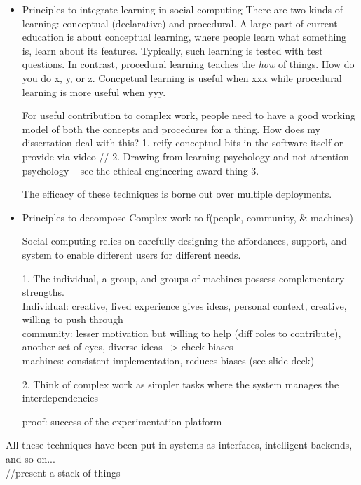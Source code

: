 \begin{itemize}
\item Principles to integrate learning in social computing 
There are two kinds of learning: conceptual (declarative) and procedural. A large part of current education is about conceptual learning, where people learn what something is, learn about its features. Typically, such learning is tested with test questions. In contrast, procedural learning teaches the {\it how} of things. How do you do x, y, or z.  Concpetual learning is useful when xxx while procedural learning is more useful when yyy.


For useful contribution to complex work, people need to have a good working model of both the concepts and procedures for a thing. How does my dissertation deal with this?
1. reify conceptual bits in the software itself or provide via video //
2. Drawing from learning psychology and not attention psychology 
-- see the ethical engineering award thing
3. 

The efficacy of these techniques is borne out over multiple deployments. 

\item  Principles to decompose Complex work to f(people, community, \& machines)

Social computing relies on carefully designing the affordances, support, and system to enable different users for different needs.

1. The individual, a group, and groups of machines possess complementary strengths. \\
Individual: creative, lived experience gives ideas, personal context, creative, willing to push through \\
community: lesser motivation but willing to help (diff roles to contribute), another set of eyes, diverse ideas --> check biases \\
machines: consistent implementation, reduces biases
(see slide deck)

2. Think of complex work as simpler tasks where the system manages the interdependencies

proof: success of the experimentation platform

\end{itemize}

All these techniques have been put in systems as interfaces, intelligent backends, and so on... \\
//present a stack of things


